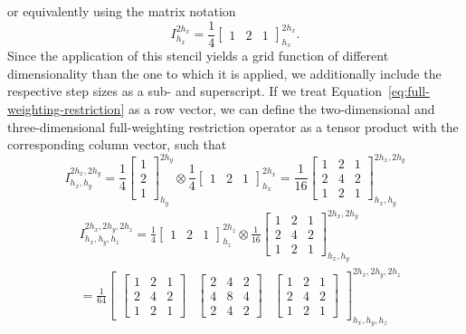 or equivalently using the matrix notation
\begin{equation}
	I_{h_x}^{2h_x} =  \frac{1}{4} \begin{bmatrix}
			1 & 2 & 1
		\end{bmatrix}_{h_x}^{2h_x}.
	\label{eq:full-weighting-restriction}
\end{equation} 
Since the application of this stencil yields a grid function of different dimensionality than the one to which it is applied, we additionally include the respective step sizes as a sub- and superscript.
If we treat Equation~\eqref{eq:full-weighting-restriction} as a row vector, we can define the two-dimensional and three-dimensional full-weighting restriction operator as a tensor product with the corresponding column vector, such that
\begin{equation}
	I^{2h_x, 2h_y}_{h_x, h_y} = \frac{1}{4} \begin{bmatrix}
		1 \\ 2 \\ 1
	\end{bmatrix}_{h_y}^{2h_y} \otimes \frac{1}{4} \begin{bmatrix}
		1 & 2 & 1
	\end{bmatrix}_{h_x}^{2h_x} =
\frac{1}{16} 
\begin{bmatrix}
	1 & 2 & 1 \\
	2 & 4 & 2 \\
	1 & 2 & 1
\end{bmatrix}^{2h_x, 2h_y}_{h_x, h_y}
\end{equation} 
\begin{equation}
\begin{split}
	& I^{2h_x, 2h_y, 2h_z}_{h_x, h_y, h_z} = \frac{1}{4} \begin{bmatrix}
		1 & 2 & 1
	\end{bmatrix}_{h_z}^{2h_z} \otimes 
	\frac{1}{16} 
	\begin{bmatrix}
		1 & 2 & 1 \\
		2 & 4 & 2 \\
		1 & 2 & 1
	\end{bmatrix}^{2h_x, 2h_y}_{h_x, h_y} \\
& = \frac{1}{64} \begin{bmatrix}
\begin{bmatrix}
	1 & 2 & 1 \\
	2 & 4 & 2 \\
	1 & 2 & 1
\end{bmatrix} &	\begin{bmatrix}
2 & 4 & 2 \\
4 & 8 & 4 \\
2 & 4 & 2
\end{bmatrix} &
\begin{bmatrix}
	1 & 2 & 1 \\
	2 & 4 & 2 \\
	1 & 2 & 1
\end{bmatrix}
\end{bmatrix}^{2h_x, 2h_y, 2h_z}_{h_x, h_y, h_z}
\end{split}
\end{equation}
